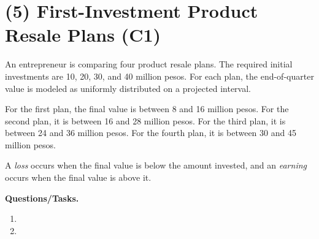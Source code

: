 \newcommand{\InvestmentThresholdGraph}[6]{%
	\begin{tikzpicture}
		\pgfmathsetmacro{\GraphXMin}{(#1)-0.8}
		\pgfmathsetmacro{\GraphXMax}{(#2)+0.8}
		\pgfmathsetmacro{\PdfHeight}{#3}
		\begin{axis}[
			width=5.3cm,
			height=2.6cm,
			axis lines=left,
			xmin=\GraphXMin,
			xmax=\GraphXMax,
			ymin=0,
			ymax=#6,
			xtick={#5},
			ytick=\empty,
			tick label style={font=\scriptsize},
			xlabel={$v$},
			xlabel style={font=\scriptsize},
			grid=both,
			clip=false
			]
			\draw[fill=red!25, draw=none] (axis cs:#1,0) rectangle (axis cs:#4,\PdfHeight);
			\draw[fill=green!20, draw=none] (axis cs:#4,0) rectangle (axis cs:#2,\PdfHeight);
			\addplot[very thick, blue] coordinates {(#1,\PdfHeight) (#2,\PdfHeight)};
			\addplot[thick, blue] coordinates {(#1,0) (#1,\PdfHeight)};
			\addplot[thick, blue] coordinates {(#2,0) (#2,\PdfHeight)};
			\addplot[dashed, thick, black] coordinates {(#4,0) (#4,\PdfHeight)};
			\node[font=\scriptsize, anchor=south] at (axis cs:#4,\PdfHeight) {investment};
		\end{axis}
	\end{tikzpicture}%
}

\section{(5) First-Investment Product Resale Plans (C1)}
\label{sec:first-investment-product-resale-plans-c1}

An entrepreneur is comparing four product resale plans. The required initial investments are 10, 20, 30, and 40 million pesos. For each plan, the end-of-quarter value is modeled as uniformly distributed on a projected interval.

For the first plan, the final value is between 8 and 16 million pesos. For the second plan, it is between 16 and 28 million pesos. For the third plan, it is between 24 and 36 million pesos. For the fourth plan, it is between 30 and 45 million pesos.

A \emph{loss} occurs when the final value is below the amount invested, and an \emph{earning} occurs when the final value is above it.

\textbf{Questions/Tasks.}
\begin{enumerate}[label=\textbf{\alph*)}]
	\item {}
	\item {}
\end{enumerate}


